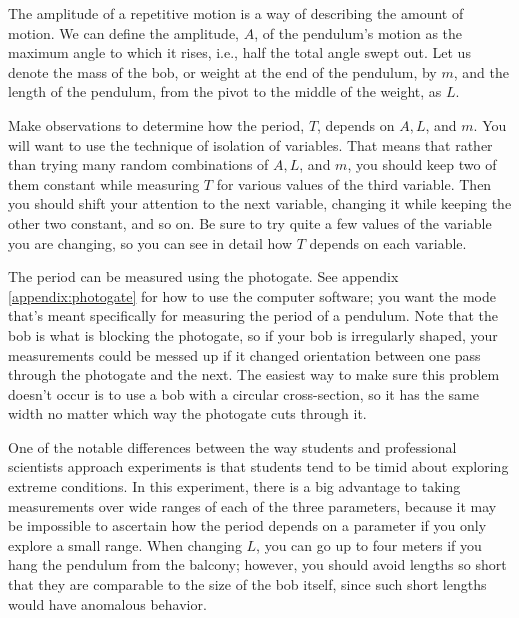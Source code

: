 
The amplitude of a repetitive motion is a way of describing
the amount of motion.  We can define the amplitude, $A$, of
the pendulum's motion as the maximum angle to which it
rises, i.e., half the total angle swept out.  Let us denote
the mass of the bob, or weight at the end of the pendulum,
by $m$, and the length of the pendulum, from the pivot to
the middle of the weight, as $L$.

\observations

Make observations to determine how the period, $T$, depends
on $A,L$, and $m$.  You will want to use the technique of
isolation of variables.  That means that rather than trying
many random combinations of $A,L$, and $m$, you should keep
two of them constant while measuring $T$ for various values
of the third variable.  Then you should shift your attention
to the next variable, changing it while keeping the other
two constant, and so on.  Be sure to try quite a few values
of the variable you are changing, so you can see in detail
how $T$ depends on each variable.

The period can be measured using the photogate.  See
appendix \ref{appendix:photogate} for how to use the computer software; you want
the mode that's meant specifically for measuring the period
of a pendulum.  Note that the bob is what is blocking the
photogate, so if your bob is irregularly shaped, your
measurements could be messed up if it changed orientation
between one pass through the photogate and the next.  The
easiest way to make sure this problem doesn't occur is to
use a bob with a circular cross-section, so it has the same
width no matter which way the photogate cuts through it.

One of the notable differences between the way students and
professional scientists approach experiments is that
students tend to be timid about exploring extreme conditions.
 In this experiment, there is a big advantage to taking
measurements over wide ranges of each of the three
parameters, because it may be impossible to ascertain how
the period depends on a parameter if you only explore a
small range. When changing $L$, you can go up to four meters
if you hang the pendulum from the balcony; however, you should avoid lengths so short
that they are comparable to the size of the bob itself,
since such short lengths would have anomalous behavior.

